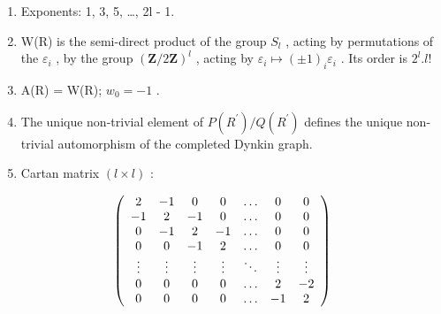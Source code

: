 \begin{enumerate}
\def\labelenumi{(\Roman{enumi})}
\setcounter{enumi}{8}
\item
  Exponents: 1, 3, 5, \ldots, 2l - 1.
\item
  W(R) is the semi-direct product of the group \(S_{l}\) , acting by permutations of the \(\varepsilon_{i}\) , by the group \((\mathbf{Z}/2\mathbf{Z})^{l}\) , acting by \(\varepsilon_{i} \mapsto (\pm1)_{i}\varepsilon_{i}\) . Its order is \(2^{l}.l!\)
\item
  A(R) = W(R); \(w_{0} = -1\) .
\item
  The unique non-trivial element of \(P(R^{\prime})/Q(R^{\prime})\) defines the unique non-trivial automorphism of the completed Dynkin graph.
\item
  Cartan matrix \((l \times l)\) :
\end{enumerate}

\[
\left( \begin{array}{c c c c c c c} 2 & - 1 & 0 & 0 & \dots & 0 & 0 \\ - 1 & 2 & - 1 & 0 & \dots & 0 & 0 \\ 0 & - 1 & 2 & - 1 & \dots & 0 & 0 \\ 0 & 0 & - 1 & 2 & \dots & 0 & 0 \\ \vdots & \vdots & \vdots & \vdots & \ddots & \vdots & \vdots \\ 0 & 0 & 0 & 0 & \dots & 2 & - 2 \\ 0 & 0 & 0 & 0 & \dots & - 1 & 2 \end{array} \right)
\]

